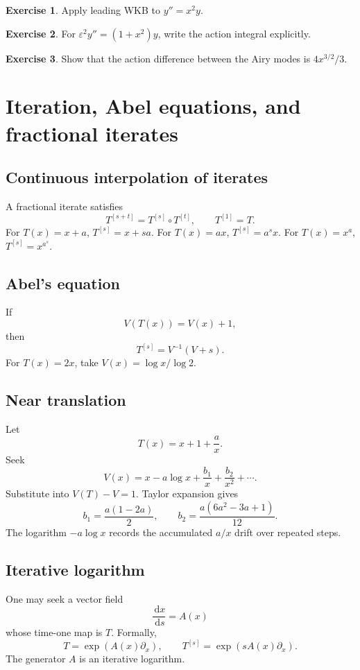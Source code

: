 \documentclass[11pt,oneside,openany]{book}
\newcommand{\dd}{\,\mathrm{d}}
\newcommand{\eps}{\varepsilon}
\newcommand{\compose}{\mathbin{\circ}}
\theoremstyle{plain}
\theoremstyle{definition}
\newtheorem{exercise}{Exercise}[chapter]
\theoremstyle{remark}
\begin{document}
\begin{exercise}
Apply leading WKB to $y''=x^2y$.
\end{exercise}

\begin{exercise}
For $\eps^2y''=(1+x^2)y$, write the action integral explicitly.
\end{exercise}

\begin{exercise}
Show that the action difference between the Airy modes is $4x^{3/2}/3$.
\end{exercise}


\chapter{Iteration, Abel equations, and fractional iterates}
\label{ch:iteration}

\section{Continuous interpolation of iterates}
A fractional iterate satisfies
\[
  T^{[s+t]}=T^{[s]}\compose T^{[t]},
  \qquad T^{[1]}=T.
\]
For $T(x)=x+a$, $T^{[s]}=x+sa$. For $T(x)=ax$, $T^{[s]}=a^sx$. For $T(x)=x^a$, $T^{[s]}=x^{a^s}$.

\section{Abel's equation}
If
\[
  V(T(x))=V(x)+1,
\]
then
\[
  T^{[s]}=V^{-1}(V+s).
\]
For $T(x)=2x$, take $V(x)=\log x/\log2$.

\section{Near translation}
Let
\[
  T(x)=x+1+\frac ax.
\]
Seek
\[
  V(x)=x-a\log x+\frac{b_1}{x}+\frac{b_2}{x^2}+\cdots.
\]
Substitute into $V(T)-V=1$. Taylor expansion gives
\[
  b_1=\frac{a(1-2a)}2,
  \qquad
  b_2=\frac{a(6a^2-3a+1)}{12}.
\]
The logarithm $-a\log x$ records the accumulated $a/x$ drift over repeated steps.

\section{Iterative logarithm}
One may seek a vector field
\[
  \frac{\dd x}{\dd s}=A(x)
\]
whose time-one map is $T$. Formally,
\[
  T=\exp(A(x)\partial_x),
  \qquad
  T^{[s]}=\exp(sA(x)\partial_x).
\]
The generator $A$ is an iterative logarithm.
\end{document}
